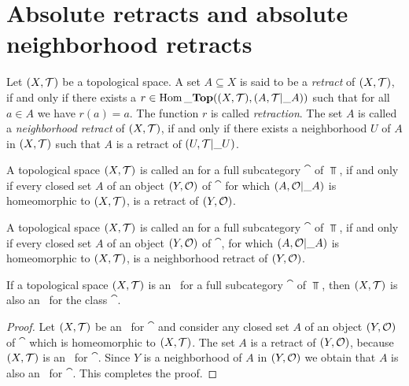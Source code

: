 \section{Absolute retracts and absolute neighborhood retracts}

\begin{definition}
	Let $\tspace$ be a topological space. A set $A \subseteq X$ is said to be a \textit{retract} of $\tspace$, if and only if there exists a $r \in \Hom\_\Top\pbraces{\tspace, \reltspace}$ such that for all $a \in A$ we have $r(a) = a$. The function $r$ is called \textit{retraction}. The set $A$ is called a \textit{neighborhood retract} of $\tspace$, if and only if there exists a neighborhood $U$ of $A$ in $\tspace$ such that $A$ is a retract of $\reltspace[U][T]$. 
\end{definition}

\begin{definition}
	A topological space $\tspace$ is called an \textit{\ar} for a full subcategory $\cat$ of $\Top$, if and only if every closed set $A$ of an object $\tspace[Y][O]$ of $\cat$ for which ${\left ( A, \mathcal{O}\vert\_A \right )}$ is homeomorphic to $\tspace$, is a retract of $\tspace[Y][O]$.    
\end{definition}

\begin{definition}
	A topological space $\tspace$ is called an \textit{\anr} for a full subcategory $\cat$ of $\Top$, if and only if every closed set $A$ of an object $\tspace[Y][O]$ of $\cat$, for which ${\left ( A, \mathcal{O}\vert\_A \right )}$ is homeomorphic to $\tspace$, is a neighborhood retract of $\tspace[Y][O]$.    
\end{definition}

\begin{proposition}
	If a topological space $\tspace$ is an \ar\ for a full subcategory $\cat$ of $\Top$, then $\tspace$ is also an \anr\ for the class $\cat$. 
\end{proposition}
\begin{proof}
	Let $\tspace$ be an \ar\ for $\cat$ and consider any closed set $A$ of an object $\tspace[Y][O]$ of $\cat$ which is homeomorphic to $\tspace$. The set $A$ is a retract of $\tspace[Y][O]$, because $\tspace$ is an \ar\ for $\cat$. Since $Y$ is a neighborhood of $A$ in $\tspace[Y][O]$ we obtain that $A$ is also an \anr\ for $\cat$. This completes the proof. 
\end{proof}

